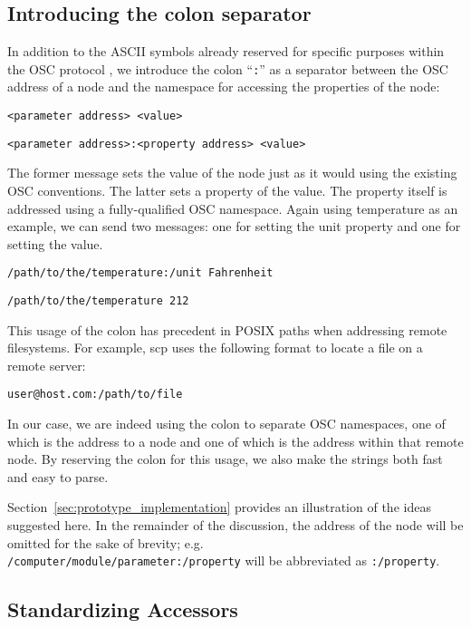 \documentclass{NIME-alternate}
\begin{document}
\subsection{Introducing the colon separator}
\label{sub:the_colon_separator}

In addition to the ASCII symbols already reserved for specific purposes within the OSC protocol \cite{Wright:1997}, we introduce the colon ``\texttt{:}'' as a separator between the OSC address of a node and the namespace for accessing the properties of the node:

\texttt{<parameter address> <value>}

\texttt{<parameter address>:<property address> <value>}

The former message sets the value of the node just as it would using the existing OSC conventions. The latter sets a property of the value.  The property itself is addressed using a fully-qualified OSC namespace. Again using temperature as an example, we can send two messages: one for setting the unit property and one for setting the value.

\texttt{/path/to/the/temperature:/unit Fahrenheit}

\texttt{/path/to/the/temperature 212}

This usage of the colon has precedent in POSIX paths when addressing remote filesystems.  For example, scp uses the following format to locate a file on a remote server:

\texttt{user@host.com:/path/to/file}

In our case, we are indeed using the colon to separate OSC namespaces, one of which is the address to a node and one of which is the address within that remote node.  By reserving the colon for this usage, we also make the strings both fast and easy to parse.

Section~\ref{sec:prototype_implementation} provides an illustration of the ideas suggested here. In the remainder of the discussion, the address of the node will be omitted for the sake of brevity; e.g.\\ 
\texttt{/computer/module/parameter:/property}  
will be abbreviated as \texttt{:/property}.



\subsection{Standardizing Accessors}
\end{document}

